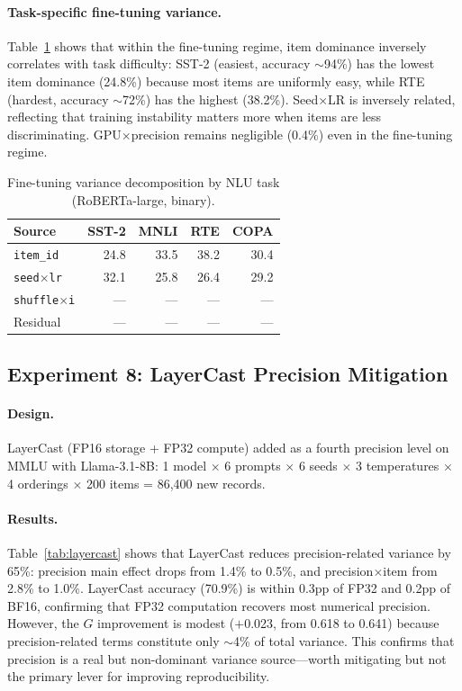 \documentclass[letterpaper]{article}
\newcommand{\gcoeff}{\ensuremath{G}}
\newcommand{\pct}{\%}
\begin{document}
\paragraph{Task-specific fine-tuning variance.}
Table~\ref{tab:ft-tasks} shows that within the fine-tuning regime, item dominance inversely correlates with task difficulty: SST-2 (easiest, accuracy $\sim$94\pct{}) has the lowest item dominance (24.8\pct{}) because most items are uniformly easy, while RTE (hardest, accuracy $\sim$72\pct{}) has the highest (38.2\pct{}).
Seed$\times$LR is inversely related, reflecting that training instability matters more when items are less discriminating.
GPU$\times$precision remains negligible (0.4\pct{}) even in the fine-tuning regime.

\begin{table}[t]
\centering
\caption{Fine-tuning variance decomposition by NLU task (RoBERTa-large, binary).}
\label{tab:ft-tasks}
\small
\begin{tabular}{lrrrr}
\toprule
Source & SST-2 & MNLI & RTE & COPA \\
\midrule
\texttt{item\_id}      & 24.8 & 33.5 & 38.2 & 30.4 \\
\texttt{seed$\times$lr} & 32.1 & 25.8 & 26.4 & 29.2 \\
\texttt{shuffle$\times$i} & --- & --- & --- & --- \\
Residual                & --- & --- & --- & --- \\
\bottomrule
\end{tabular}
\end{table}

\subsection{Experiment 8: LayerCast Precision Mitigation}

\paragraph{Design.}
LayerCast (FP16 storage + FP32 compute) added as a fourth precision level on MMLU with Llama-3.1-8B: 1 model $\times$ 6 prompts $\times$ 6 seeds $\times$ 3 temperatures $\times$ 4 orderings $\times$ 200 items = 86,400 new records.

\paragraph{Results.}
Table~\ref{tab:layercast} shows that LayerCast reduces precision-related variance by 65\pct{}: precision main effect drops from 1.4\pct{} to 0.5\pct{}, and precision$\times$item from 2.8\pct{} to 1.0\pct{}.
LayerCast accuracy (70.9\pct{}) is within 0.3pp of FP32 and 0.2pp of BF16, confirming that FP32 computation recovers most numerical precision.
However, the $\gcoeff{}$ improvement is modest ($+$0.023, from 0.618 to 0.641) because precision-related terms constitute only $\sim$4\pct{} of total variance.
This confirms that precision is a real but non-dominant variance source---worth mitigating but not the primary lever for improving reproducibility.
\end{document}
